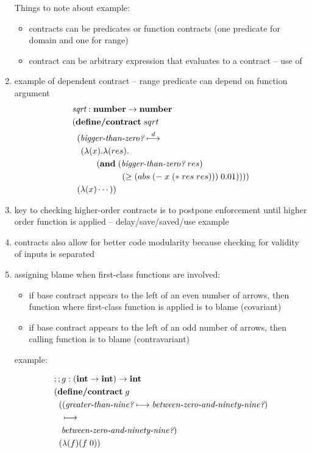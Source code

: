 \documentclass[12pt]{article}	%
\newcommand{\keyw}[1]{ \ensuremath{ \textbf{#1} } }
\newcommand{\integer}{ \keyw{int} }
\newcommand{\num}{ \keyw{number} }
\newcommand{\numnum}{ \ensuremath{ \num\rightarrow\num } }
\newcommand{\intint}{ \ensuremath{ \integer\rightarrow\integer } }
\newcommand{\defcontract}{ \keyw{define/contract} }
\newcommand{\contract}{ \ensuremath{ \longmapsto } }
\newcommand{\dcontract}{ \ensuremath{ \stackrel{d}{\longmapsto} } }
\begin{document}
\begin{enumerate}
Things to note about example:
\begin{itemize}	
	\item contracts can be predicates or function contracts (one predicate for domain and one for range)
	\item contract can be arbitrary expression that evaluates to a contract -- use of \biggerthanzero
\end{itemize}

	\item example of dependent contract -- range predicate can depend on function argument
\begin{align*}
& \textit{sqrt} : \numnum \\
& (\defcontract \; sqrt \\
& \;\;(\biggerthanzero \dcontract \\
& \;\;\;\,(\lambda(x).\lambda(res). \\
& \hspace{10mm}(\keyw{and} \; (\biggerthanzero \; res) \\
& \hspace{20.5mm}               (\geq (abs \; (- \; x \; (* \; res \; res))) \; 0.01)))) \\
& \;\;(\lambda (x) \cdots))
\end{align*}
	
	\item key to checking higher-order contracts is to postpone enforcement until higher order function is applied -- delay/save/saved/use example
	\item contracts also allow for better code modularity because checking for validity of inputs is separated
	\item assigning blame when first-class functions are involved:
	\begin{itemize}
		\item if base contract appears to the left of an even number of arrows, then function where first-class function is applied is to blame (covariant)
		\item if base contract appears to the left of an odd number of arrows, then calling function is to blame (contravariant)
	\end{itemize}
	example:

\newcommand{\greaterthannine}{ \textit{greater-than-nine?} }
\newcommand{\betweenzeroandninetynine}{ \textit{between-zero-and-ninety-nine?} }


\begin{align*}
& ;; g:(\intint)\rightarrow\integer \\
& (\defcontract \; g \\
& \;\;((\greaterthannine \contract \betweenzeroandninetynine) \\
& \hspace{3mm} \contract \\
& \hspace{3mm} \betweenzeroandninetynine) \\
& \;\;(\lambda(f)(f \; 0)) 
\end{align*}


\end{enumerate}
\end{document}
